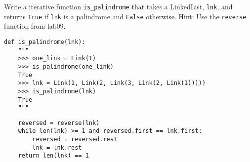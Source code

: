 \question 
Write a iterative function \texttt{is\_palindrome} that takes a LinkedList, 
\texttt{lnk}, and returns \texttt{True} if \texttt{lnk} is a
palindrome and \texttt{False} otherwise. Hint: Use the \texttt{reverse} 
function from lab09.

\begin{lstlisting}
def is_palindrome(lnk):
    """
    >>> one_link = Link(1)
    >>> is_palindrome(one_link)
    True
    >>> lnk = Link(1, Link(2, Link(3, Link(2, Link(1)))))
    >>> is_palindrome(lnk)
    True
    """
\end{lstlisting}
\begin{solution}[1in]
\begin{lstlisting}
    reversed = reverse(lnk)
    while len(lnk) >= 1 and reversed.first == lnk.first:
        reversed = reversed.rest
        lnk = lnk.rest
    return len(lnk) == 1
\end{lstlisting}
\end{solution}
